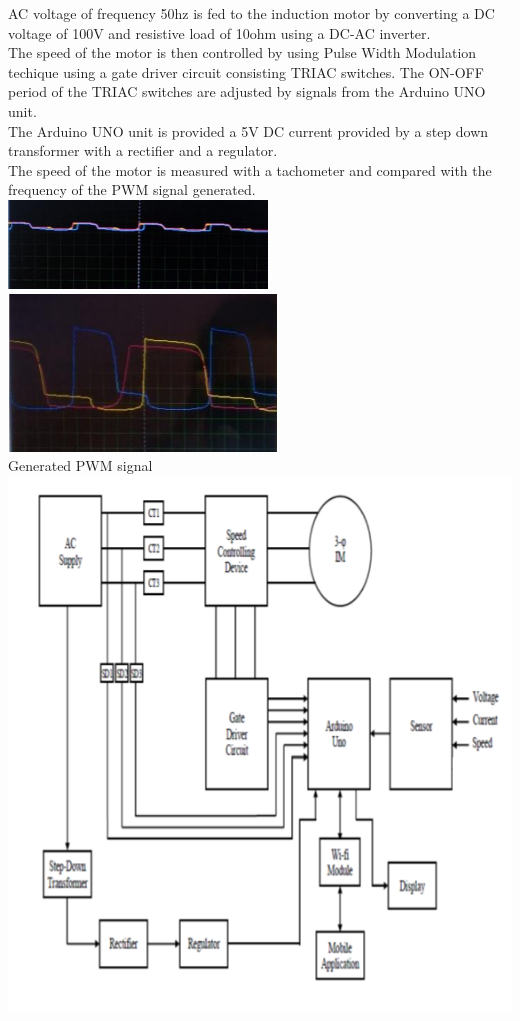 AC voltage of frequency 50hz is fed to the induction motor by converting a DC voltage of 100V and resistive load of 10ohm using a DC-AC inverter.\\ 
The speed of the motor is then controlled by using Pulse Width Modulation techique using a gate driver circuit consisting TRIAC switches. The ON-OFF period of the TRIAC switches are adjusted by signals from the Arduino UNO unit.\\ 
The Arduino UNO unit is provided a 5V DC current provided by a step down transformer with a rectifier and a regulator.\\ 
The speed of the motor is measured with a tachometer and compared with the frequency of the PWM signal generated.\\
{\includegraphics[height=0.18\textheight]{Figures/g1.png}}
\\
{\includegraphics[height=0.2\textheight]{Figures/g2.png}}
\\
Generated PWM signal
\\
{\includegraphics[height=0.4\textheight]{Figures/g3.png}}
